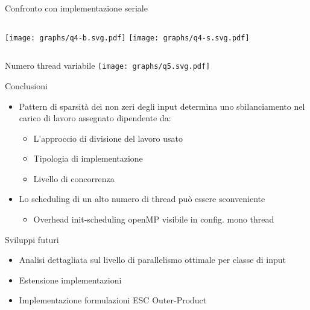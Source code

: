 \begin{frame} {Confronto con implementazione seriale}
\begin{columns}
	\texttt{[image: graphs/q4-b.svg.pdf]}
	\texttt{[image: graphs/q4-s.svg.pdf]}
\end{columns}
\end{frame}
\begin{frame} {Numero thread variabile}
	\centering
	\texttt{[image: graphs/q5.svg.pdf]}
\end{frame}
\begin{frame} {Conclusioni}
\begin{itemize}
	\item	Pattern di sparsità dei non zeri degli input 
	determina uno sbilanciamento nel carico di lavoro assegnato
	dipendente da:
	\pause
	\begin{itemize}
		\item	L'approccio di divisione del lavoro usato
		\item	Tipologia di implementazione
		\item	Livello di concorrenza
	\end{itemize}
	\pause
	\item	Lo scheduling di un alto numero di thread può essere sconveniente
	\begin{itemize}
		\item	Overhead init-scheduling openMP visibile in config. mono thread
	\end{itemize}
	\pause
\end{itemize}
\voidLine
Sviluppi futuri
\pause
\begin{itemize}
	\item	Analisi dettagliata sul livello di parallelismo ottimale per classe di input
	\pause
	\item	Estensione implementazioni
	\pause
	\item	Implementazione formulazioni ESC Outer-Product
	\pause
\end{itemize}
\end{frame}

\appendix
\backupbegin



